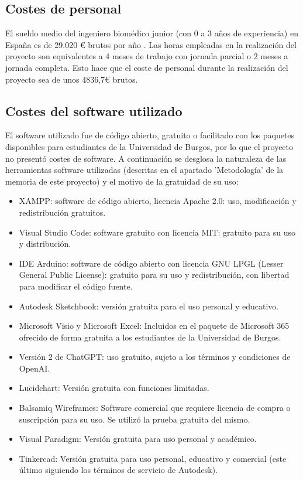 \subsection{Costes de personal}
El sueldo medio del ingeniero biomédico junior (con 0 a 3 años de experiencia) en España es de 29.020 € brutos por año \cite{jobted-ingeniero-biomedico}. Las horas empleadas en la realización del proyecto son equivalentes a 4 meses de trabajo con jornada parcial o 2 meses a jornada completa. Esto hace que el coste de personal durante la realización del proyecto sea de unos 4836,7€ brutos.
\subsection{Costes del software utilizado}
El software utilizado fue de código abierto, gratuito o facilitado con los paquetes disponibles para estudiantes de la Universidad de Burgos, por lo que el proyecto no presentó costes de software. A continuación se desglosa la naturaleza de las herramientas software utilizadas (descritas en el apartado 'Metodología' de la memoria de este proyecto) y el motivo de la gratuidad de su uso:
\begin{itemize}
    \item XAMPP: software de código abierto, licencia Apache 2.0: uso, modificación y redistribución gratuitos.
    \item Visual Studio Code: software gratuito con licencia MIT: gratuito para su uso y distribución. 
    \item IDE Arduino: software de código abierto  con licencia GNU LPGL (Lesser General Public License): gratuito para su uso y redistribución, con libertad para modificar el código fuente.
    \item Autodesk Sketchbook: versión gratuita para el uso personal y educativo.
    \item Microsoft Visio y Microsoft Excel: Incluidos en el paquete de Microsoft 365 ofrecido de forma gratuita a los estudiantes de la Universidad de Burgos.
    \item Versión 2 de ChatGPT: uso gratuito, sujeto a los términos y condiciones de OpenAI.
    \item Lucidchart: Versión gratuita con funciones limitadas.
    \item Balsamiq Wireframes: Software comercial que requiere licencia de compra o suscripción para su uso. Se utilizó la prueba gratuita del mismo.
    \item Visual Paradigm: Versión gratuita para uso personal y académico.
    \item Tinkercad: Versión gratuita para uso personal, educativo y comercial (este último siguiendo los términos de servicio de Autodesk).
\end{itemize}
